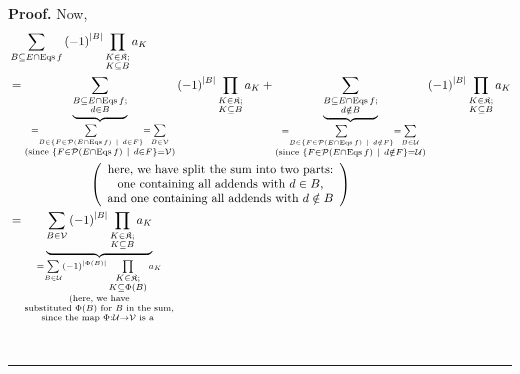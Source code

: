 \documentclass[numbers=enddot,12pt,final,onecolumn,notitlepage]{scrartcl}%
\theoremstyle{definition}
\newenvironment{proof}[1][Proof]{\noindent\textbf{#1.} }{\ \rule{0.5em}{0.5em}}
\newenvironment{verlong}{}{}
\let\sumnonlimits\sum
\let\prodnonlimits\prod
\renewcommand{\sum}{\sumnonlimits\limits}
\renewcommand{\prod}{\prodnonlimits\limits}
\begin{document}
\begin{verlong}
\begin{proof}
Now,%
\begin{align}
&  \sum_{B\subseteq E\cap\operatorname*{Eqs}f}\left(  -1\right)  ^{\left\vert
B\right\vert }\prod_{\substack{K\in\mathfrak{K};\\K\subseteq B}}a_{K}%
\nonumber\\
&  =\underbrace{\sum_{\substack{B\subseteq E\cap\operatorname*{Eqs}f;\\d\in
B}}}_{\substack{=\sum_{B\in\left\{  F\in\mathcal{P}\left(  E\cap
\operatorname*{Eqs}f\right)  \ \mid\ d\in F\right\}  }=\sum_{B\in\mathcal{V}%
}\\\text{(since }\left\{  F\in\mathcal{P}\left(  E\cap\operatorname*{Eqs}%
f\right)  \ \mid\ d\in F\right\}  =\mathcal{V}\text{)}}}\left(  -1\right)
^{\left\vert B\right\vert }\prod_{\substack{K\in\mathfrak{K};\\K\subseteq
B}}a_{K}+\underbrace{\sum_{\substack{B\subseteq E\cap\operatorname*{Eqs}%
f;\\d\notin B}}}_{\substack{=\sum_{B\in\left\{  F\in\mathcal{P}\left(
E\cap\operatorname*{Eqs}f\right)  \ \mid\ d\notin F\right\}  }=\sum
_{B\in\mathcal{U}}\\\text{(since }\left\{  F\in\mathcal{P}\left(
E\cap\operatorname*{Eqs}f\right)  \ \mid\ d\notin F\right\}  =\mathcal{U}%
\text{)}}}\left(  -1\right)  ^{\left\vert B\right\vert }\prod_{\substack{K\in
\mathfrak{K};\\K\subseteq B}}a_{K}\nonumber\\
&  \ \ \ \ \ \ \ \ \ \ \ \ \ \ \ \ \ \ \ \ \left(
\begin{array}
[c]{c}%
\text{here, we have split the sum into two parts:}\\
\text{one containing all addends with }d\in B\text{,}\\
\text{and one containing all addends with }d\notin B
\end{array}
\right) \nonumber\\
&  =\underbrace{\sum_{B\in\mathcal{V}}\left(  -1\right)  ^{\left\vert
B\right\vert }\prod_{\substack{K\in\mathfrak{K};\\K\subseteq B}}a_{K}%
}_{\substack{=\sum_{B\in\mathcal{U}}\left(  -1\right)  ^{\left\vert
\Phi\left(  B\right)  \right\vert }\prod_{\substack{K\in\mathfrak{K}%
;\\K\subseteq\Phi\left(  B\right)  }}a_{K}\\\text{(here, we have}%
\\\text{substituted }\Phi\left(  B\right)  \text{ for }B\text{ in the
sum,}\\\text{since the map }\Phi:\mathcal{U}\rightarrow\mathcal{V}\text{ is a
}}}
\end{align}
\end{proof}
\end{verlong}
\end{document}
